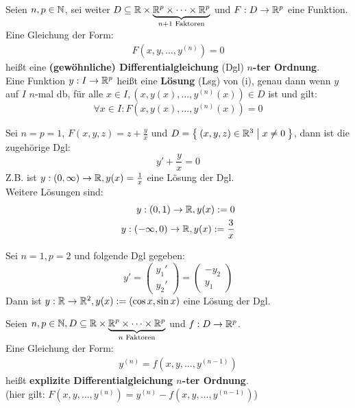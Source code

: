 \documentclass[a4paper,oneside,DIV15,BCOR12mm,chapterprefix=true,headings=onelinechapter]{scrbook}
\begin{document}
\begin{definition}
Seien $n,p\in\mathbb{N}$, sei weiter 
$D\subseteq\mathbb{R}\times\underbrace{\mathbb{R}^p\times\cdots\times\mathbb{R}^p}_{n+1 \text{ Faktoren}}$
und $F:D\to\mathbb{R}^p$ eine Funktion.\\
Eine Gleichung der Form:
\begin{align*}
F(x,y,\ldots,y^{(n)})=0 \tag{i}
\end{align*}
heißt eine \textbf{(gewöhnliche) Differentialgleichung} (Dgl) \textbf{$n$-ter Ordnung}.\\
Eine Funktion $y:I\to\mathbb{R}^p$ heißt eine \textbf{Lösung} (Lsg) von (i), genau dann wenn
$y$ auf $I$ $n$-mal db, für alle $x\in I, (x,y(x),\ldots,y^{(n)}(x))\in D$ ist und gilt:
\[\forall x\in I: F(x,y(x),\ldots,y^{(n)}(x))=0\] 
\end{definition}

\begin{beispiele}
\item Sei $n=p=1$, $F(x,y,z)=z+\frac yx$ und $D=\Set{(x,y,z)\in\ensuremath{\mathbb{R}}^3 | x\ne 0}$, dann ist die
zugehörige Dgl:
\[y'+\frac yx =0\]
Z.B. ist $y:(0,\infty)\to\mathbb{R}, y(x)=\frac1x$ eine Lösung der Dgl.\\
Weitere Lösungen sind:
\begin{align*}
y:(0,1)\to\mathbb{R},y(x):=0\\
y:(-\infty,0)\to\mathbb{R},y(x):=\frac3x
\end{align*}
\item Sei $n=1,p=2$ und folgende Dgl gegeben:
\[y'=\begin{pmatrix}y_1'\\y_2'\end{pmatrix}=\begin{pmatrix}-y_2\\y_1\end{pmatrix}\]
Dann ist $y:\mathbb{R}\to\mathbb{R}^2, y(x):=(\cos x,\sin x)$ eine Lösung der Dgl.
\end{beispiele}

\begin{definition}
Seien $n,p\in\mathbb{N}, D\subseteq \mathbb{R}\times\underbrace{\mathbb{R}^p\times\cdots\times\mathbb{R}^p}_{n \text{ Faktoren}}$
und $f:D\to\mathbb{R}^p$.\\
Eine Gleichung der Form:
\begin{align*}
y^{(n)}=f(x,y,\ldots,y^{(n-1)})\tag{ii}
\end{align*}
heißt \textbf{explizite Differentialgleichung $n$-ter Ordnung}.\\
(hier gilt: $F(x,y,\ldots,y^{(n)})=y^{(n)}-f(x,y,\ldots,y^{(n-1)})$)
\end{definition}
\end{document}
